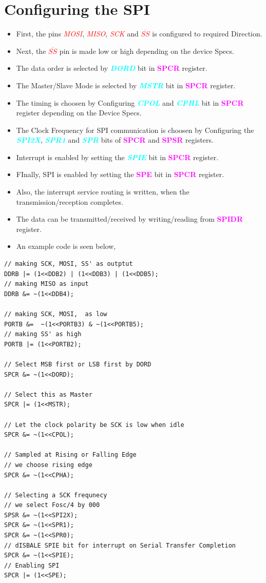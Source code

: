 \documentclass{article}
\newcommand{\bitFormat}[1]{\emph{\textbf{\textcolor{cyan}{#1}}}}
\newcommand{\regFormat}[1]{\textbf{\textcolor{magenta}{#1}}}
\newcommand{\pinFormat}[1]{\emph{\textcolor{red}{#1}}}
\begin{document}
\section{Configuring the SPI}
\begin{itemize}
    \item First, the pins \pinFormat{MOSI}, \pinFormat{MISO}, \pinFormat{SCK} and \pinFormat{$\overline{SS}$} is configured to required Direction.
    \item Next, the \pinFormat{$\overline{SS}$}  pin is made low or high depending on the device Specs.
    \item The data order is selected by \bitFormat{DORD} bit in \regFormat{SPCR} register.
    \item The Master/Slave Mode is selected by \bitFormat{MSTR} bit in \regFormat{SPCR} register.
    \item The timing is choosen by Configuring \bitFormat{CPOL} and \bitFormat{CPHL} bit in \regFormat{SPCR} register depending on the Device Specs.
    \item The Clock Frequency for SPI communication is choosen by Configuring the \bitFormat{SPI2X}, \bitFormat{SPR1} and \bitFormat{SPR} bits of \regFormat{SPCR} and \regFormat{SPSR} registers.
    \item Interrupt is enabled by setting the \bitFormat{SPIE} bit in \regFormat{SPCR} register.
    \item FInally, SPI is enabled by setting the \regFormat{SPE} bit in \regFormat{SPCR} register.
    \item Also, the interrupt service routing is written, when the transmission/reception completes.
    \item The data can be transmitted/received by writing/reading from \regFormat{SPIDR} register.
    \item An example code is seen below,
\end{itemize}

\begin{verbatim}
// making SCK, MOSI, SS' as outptut
DDRB |= (1<<DDB2) | (1<<DDB3) | (1<<DDB5);
// making MISO as input
DDRB &= ~(1<<DDB4);

// making SCK, MOSI,  as low
PORTB &=  ~(1<<PORTB3) & ~(1<<PORTB5);
// making SS' as high
PORTB |= (1<<PORTB2);

// Select MSB first or LSB first by DORD
SPCR &= ~(1<<DORD);
	
// Select this as Master
SPCR |= (1<<MSTR);

// Let the clock polarity be SCK is low when idle
SPCR &= ~(1<<CPOL);

// Sampled at Rising or Falling Edge
// we choose rising edge
SPCR &= ~(1<<CPHA);

// Selecting a SCK frequnecy
// we select Fosc/4 by 000
SPSR &= ~(1<<SPI2X);
SPCR &= ~(1<<SPR1);
SPCR &= ~(1<<SPR0);
// dISBALE SPIE bit for interrupt on Serial Transfer Completion
SPCR &= ~(1<<SPIE);
// Enabling SPI
SPCR |= (1<<SPE);
\end{verbatim}
\end{document}
